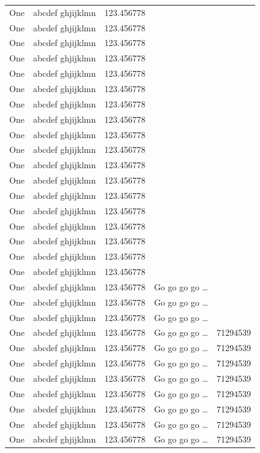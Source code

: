 \documentclass[phd,showframe]{ndsu-thesis-2022}
\begin{document}
\begin{longtable}{l l l l r}
One & abcdef ghjijklmn & 123.456778 \\
One & abcdef ghjijklmn & 123.456778 \\
One & abcdef ghjijklmn & 123.456778 \\
One & abcdef ghjijklmn & 123.456778 \\
One & abcdef ghjijklmn & 123.456778 \\
One & abcdef ghjijklmn & 123.456778 \\
One & abcdef ghjijklmn & 123.456778 \\
One & abcdef ghjijklmn & 123.456778 \\
One & abcdef ghjijklmn & 123.456778 \\
One & abcdef ghjijklmn & 123.456778 \\
One & abcdef ghjijklmn & 123.456778 \\
One & abcdef ghjijklmn & 123.456778 \\
One & abcdef ghjijklmn & 123.456778 \\
One & abcdef ghjijklmn & 123.456778 \\
One & abcdef ghjijklmn & 123.456778 \\
One & abcdef ghjijklmn & 123.456778 \\
One & abcdef ghjijklmn & 123.456778 \\
One & abcdef ghjijklmn & 123.456778 \\
One & abcdef ghjijklmn & 123.456778  & Go go go go \ldots \\
One & abcdef ghjijklmn & 123.456778  & Go go go go \ldots \\
One & abcdef ghjijklmn & 123.456778  & Go go go go \ldots \\
One & abcdef ghjijklmn & 123.456778  & Go go go go \ldots & \num{71294539}\\
One & abcdef ghjijklmn & 123.456778  & Go go go go \ldots & \num{71294539}\\
One & abcdef ghjijklmn & 123.456778  & Go go go go \ldots & \num{71294539}\\
One & abcdef ghjijklmn & 123.456778  & Go go go go \ldots & \num{71294539}\\
One & abcdef ghjijklmn & 123.456778  & Go go go go \ldots & \num{71294539}\\
One & abcdef ghjijklmn & 123.456778  & Go go go go \ldots & \num{71294539}\\
One & abcdef ghjijklmn & 123.456778  & Go go go go \ldots & \num{71294539}\\
One & abcdef ghjijklmn & 123.456778  & Go go go go \ldots & \num{71294539}\\

\end{longtable}
\end{document}
